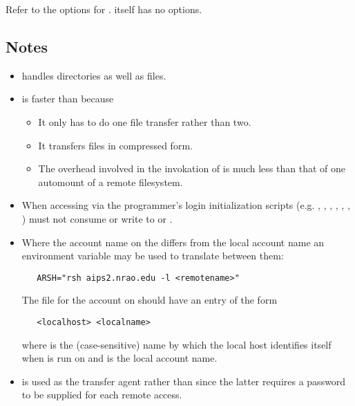 Refer to the options for .   itself has no options.
 
\subsection*{Notes}
 
\begin{itemize}
\item
    handles directories as well as files.
 
\item
    is faster than  because
 
   \begin{itemize}
   \item
      It only has to do one file transfer rather than two.
 
   \item
      It transfers files in compressed form.
 
   \item
      The overhead involved in the invokation of  is much less
      than that of one automount of a remote filesystem.
   \end{itemize}
 
\item
   When accessing  via  the programmer's
   login initialization scripts (e.g. , ,
   , , , , )
   must not consume  or write to  or .
 
\item
   Where the account name on the  differs from the local
   account name an environment variable may be used to translate between them:
 
\begin{verbatim}
   ARSH="rsh aips2.nrao.edu -l <remotename>"
\end{verbatim}
 
   \noindent
   The  file for the  account on
    should have an entry of the form
 
\begin{verbatim}
   <localhost> <localname>
\end{verbatim}
 
   \noindent
   where  is the (case-sensitive) name by which the local
   host identifies itself when  is run on
    and  is the local account name.
 
\item
    is used as the transfer agent rather than  since
   the latter requires a password to be supplied for each remote access.
\end{itemize}
 

